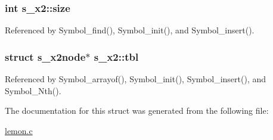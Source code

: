 \hypertarget{structs__x2_aad2d1ac9e654208ceefdb791d38771b1}{
\subsubsection[{size}]{\setlength{\rightskip}{0pt plus 5cm}int s\-\_\-x2\-::size}}\label{structs__x2_aad2d1ac9e654208ceefdb791d38771b1}


Referenced by Symbol\-\_\-find(), Symbol\-\_\-init(), and Symbol\-\_\-insert().

\hypertarget{structs__x2_ac0fdfd5d00199fae703fb916ce512405}{
\subsubsection[{tbl}]{\setlength{\rightskip}{0pt plus 5cm}struct {\bf s\-\_\-x2node}$\ast$ s\-\_\-x2\-::tbl}}\label{structs__x2_ac0fdfd5d00199fae703fb916ce512405}


Referenced by Symbol\-\_\-arrayof(), Symbol\-\_\-init(), Symbol\-\_\-insert(), and Symbol\-\_\-\-Nth().



The documentation for this struct was generated from the following file\-:\begin{DoxyCompactItemize}
\item 
\hyperlink{lemon_8c}{lemon.\-c}\end{DoxyCompactItemize}
